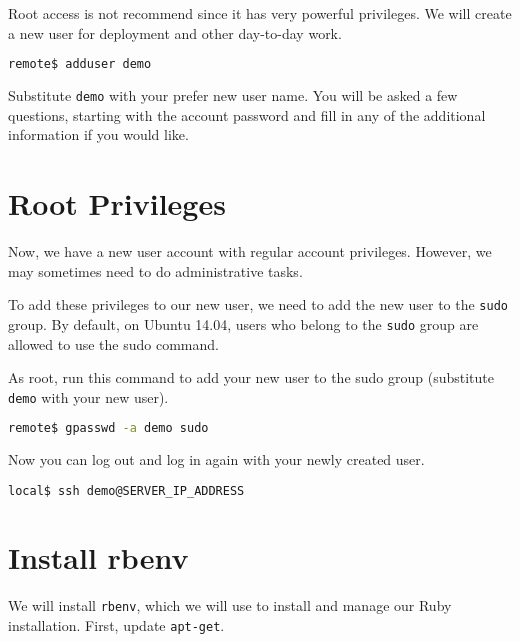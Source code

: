 Root access is not recommend since it has very powerful privileges.
We will create a new user for deployment and other day-to-day work.

\begin{minipage}{\linewidth}
\begin{lstlisting}[language=bash]
remote$ adduser demo
\end{lstlisting}
\end{minipage}

Substitute \texttt{demo} with your prefer new user name.
You will be asked a few questions, starting with the account password
and fill in any of the additional information if you would like.

\section{Root Privileges}

Now, we have a new user account with regular account privileges.
However, we may sometimes need to do administrative tasks.

To add these privileges to our new user, we need to add the new user
to the \texttt{sudo} group. By default, on Ubuntu 14.04,
users who belong to the \texttt{sudo} group are allowed to use the sudo command.

As root, run this command to add your new user to the sudo group
(substitute \texttt{demo} with your new user).

\begin{minipage}{\linewidth}
\begin{lstlisting}[language=bash]
remote$ gpasswd -a demo sudo
\end{lstlisting}
\end{minipage}

Now you can log out and log in again with your newly created user.

\begin{minipage}{\linewidth}
\begin{lstlisting}[language=bash]
local$ ssh demo@SERVER_IP_ADDRESS
\end{lstlisting}
\end{minipage}

\section{Install rbenv}

We will install \texttt{rbenv}, which we will use to install and manage our
Ruby installation. First, update \texttt{apt-get}.


